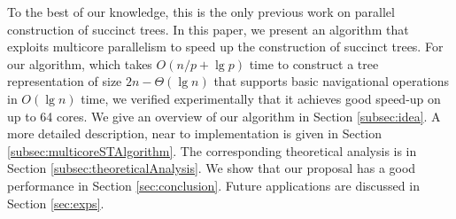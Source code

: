 To the best of our knowledge, this is the only previous work on
parallel construction of succinct trees. In this paper, we
present an algorithm that exploits multicore parallelism to speed up
the construction of succinct trees.  For our algorithm, which takes $O(n/p + \lg p)$
time to construct a tree
representation of size $2n - \Theta(\lg n)$ that supports basic
navigational operations in $O(\lg n)$ time, we verified experimentally
that it achieves good speed-up on up to 64 cores.    We give an
overview of our algorithm in Section \ref{subsec:idea}. A more
detailed description, near to implementation is given in Section
\ref{subsec:multicoreSTAlgorithm}.  The corresponding theoretical
analysis is in Section \ref{subsec:theoreticalAnalysis}.  We show that
our proposal has a good performance in Section
\ref{sec:conclusion}. Future applications are discussed in Section
\ref{sec:exps}.  
